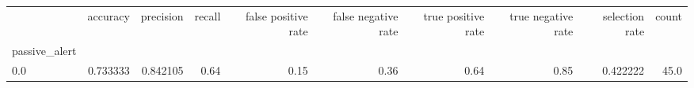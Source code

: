 \begin{tabular}{lrrrrrrrrr}
\toprule
{} &  accuracy &  precision &  recall &  false positive rate &  false negative rate &  true positive rate &  true negative rate &  selection rate &  count \\
passive\_alert &           &            &         &                      &                      &                     &                     &                 &        \\
\midrule
0.0           &  0.733333 &   0.842105 &    0.64 &                 0.15 &                 0.36 &                0.64 &                0.85 &        0.422222 &   45.0 \\
\bottomrule
\end{tabular}
